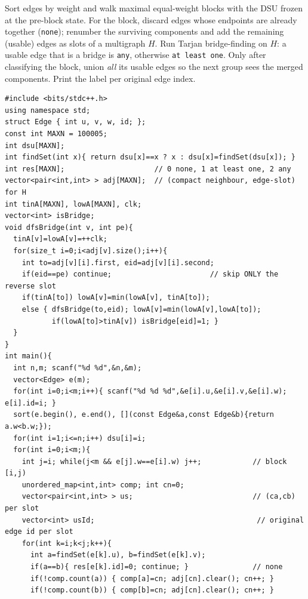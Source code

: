 Sort edges by weight and walk maximal equal-weight blocks with the DSU frozen at
the pre-block state.  For the block, discard edges whose endpoints are already
together (\texttt{none}); renumber the surviving components and add the remaining
(usable) edges as slots of a multigraph \(H\).  Run Tarjan bridge-finding on \(H\): a
usable edge that is a bridge is \texttt{any}, otherwise \texttt{at least one}.  Only
after classifying the block, union \emph{all} its usable edges so the next group
sees the merged components.  Print the label per original edge index.

\begin{lstlisting}[caption={CF 160D. Per weight group: contract lighter edges, build the multigraph H of usable edges, Tarjan bridges (skip only the reverse edge-slot, so parallel edges are never false bridges). bridge->any, non-bridge usable->at least one, pre-merged->none. Union the whole block only after classifying}, label={lst:c17-edges}]
#include <bits/stdc++.h>
using namespace std;
struct Edge { int u, v, w, id; };
const int MAXN = 100005;
int dsu[MAXN];
int findSet(int x){ return dsu[x]==x ? x : dsu[x]=findSet(dsu[x]); }
int res[MAXN];                     // 0 none, 1 at least one, 2 any
vector<pair<int,int> > adj[MAXN];  // (compact neighbour, edge-slot) for H
int tinA[MAXN], lowA[MAXN], clk;
vector<int> isBridge;
void dfsBridge(int v, int pe){
  tinA[v]=lowA[v]=++clk;
  for(size_t i=0;i<adj[v].size();i++){
    int to=adj[v][i].first, eid=adj[v][i].second;
    if(eid==pe) continue;                       // skip ONLY the reverse slot
    if(tinA[to]) lowA[v]=min(lowA[v], tinA[to]);
    else { dfsBridge(to,eid); lowA[v]=min(lowA[v],lowA[to]);
           if(lowA[to]>tinA[v]) isBridge[eid]=1; }
  }
}
int main(){
  int n,m; scanf("%d %d",&n,&m);
  vector<Edge> e(m);
  for(int i=0;i<m;i++){ scanf("%d %d %d",&e[i].u,&e[i].v,&e[i].w); e[i].id=i; }
  sort(e.begin(), e.end(), [](const Edge&a,const Edge&b){return a.w<b.w;});
  for(int i=1;i<=n;i++) dsu[i]=i;
  for(int i=0;i<m;){
    int j=i; while(j<m && e[j].w==e[i].w) j++;            // block [i,j)
    unordered_map<int,int> comp; int cn=0;
    vector<pair<int,int> > us;                            // (ca,cb) per slot
    vector<int> usId;                                      // original edge id per slot
    for(int k=i;k<j;k++){
      int a=findSet(e[k].u), b=findSet(e[k].v);
      if(a==b){ res[e[k].id]=0; continue; }               // none
      if(!comp.count(a)) { comp[a]=cn; adj[cn].clear(); cn++; }
      if(!comp.count(b)) { comp[b]=cn; adj[cn].clear(); cn++; }

\end{lstlisting}
